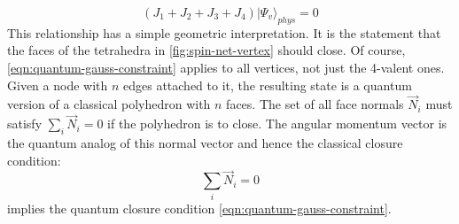 \documentclass[preprint]{SciPost}
\newcommand{\ket}[1]{\vert #1 \rangle}
\theoremstyle{plain} %
\begin{document}
\begin{equation}\label{eqn:physical-wf}
	(J_1 + J_2 + J_3 + J_4) \ket{\Psi_v}_{phys} = 0
\end{equation}
This relationship has a simple geometric interpretation. It is the statement that the faces of the tetrahedra in \autoref{fig:spin-net-vertex} should close. Of course, \eqref{eqn:quantum-gauss-constraint} applies to all vertices, not just the 4-valent ones. Given a node with $ n $ edges attached to it, the resulting state is a quantum version of a classical polyhedron with $ n $ faces. The set of all face normals $ \vec{N}_i $ must satisfy $ \sum_i \vec{N}_i = 0 $ if the polyhedron is to close. The angular momentum vector is the quantum analog of this normal vector and hence the classical closure condition:
\begin{equation}\label{eqn:classical-closure-condition}
\sum_i \vec{N}_i = 0
\end{equation}
implies the quantum closure condition \eqref{eqn:quantum-gauss-constraint}.
\end{document}
